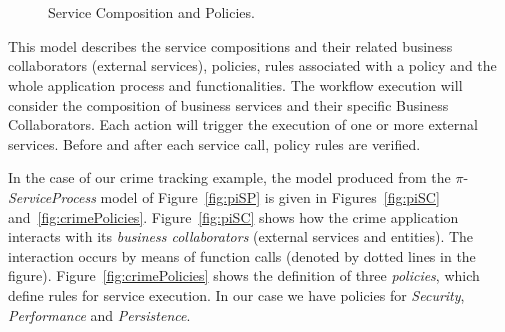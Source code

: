 \begin{figure}[t]
\centering
{}
~ %
\\
~ %
\caption{Service Composition and Policies.}
\label{fig:policies}
\end{figure}
This model describes the service compositions and their related business
collaborators (external services), policies, rules associated with a policy and
the whole application process and functionalities.
The workflow execution will consider the composition of business services and
their specific Business Collaborators. 
Each action will trigger the execution of one or more external services. 
Before and after each service call, policy rules are verified.

In the case of our crime tracking example, the model produced from the $\pi$-\textit{ServiceProcess} model of Figure~\ref{fig:piSP} is given in Figures~\ref{fig:piSC} and~\ref{fig:crimePolicies}.
Figure~\ref{fig:piSC} shows how the crime application interacts with its \textit{business collaborators} (external services and entities).
The interaction occurs by means of function calls (denoted by dotted lines in the figure).
Figure~\ref{fig:crimePolicies} shows the definition of three \textit{policies}, which define rules for service execution.
In our case we have policies for \textit{Security}, \textit{Performance} and \textit{Persistence}. 


